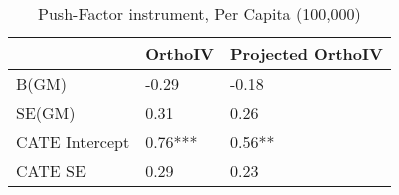\begin{table}\centering\caption{Push-Factor instrument, Per Capita (100,000)}\begin{tabular}{lll}
\toprule
                & OrthoIV   & Projected OrthoIV   \\
\midrule
 B(GM)          & -0.29     & -0.18               \\
 SE(GM)         & 0.31      & 0.26                \\
 CATE Intercept & 0.76***   & 0.56**              \\
 CATE SE        & 0.29      & 0.23                \\
\bottomrule
\end{tabular}\end{table}